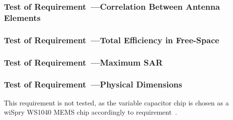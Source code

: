 \subsubsection{Test of Requirement~---Correlation Between Antenna Elements}


\subsubsection{Test of Requirement~---Total Efficiency in Free-Space}

\subsubsection{Test of Requirement~---Maximum SAR}


\subsubsection{Test of Requirement~---Physical Dimensions} This requirement is not tested, as the variable capacitor chip is chosen as a wiSpry WS1040 MEMS chip accordingly to requirement~. 

\cite{cita2015}